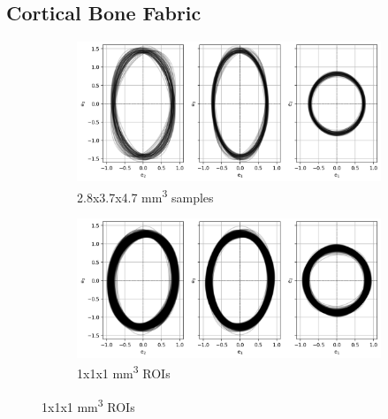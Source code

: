 \documentclass[a4paper,fleqn]{DC_ArtStyle}
\begin{document}
	\subsection{Cortical Bone Fabric}
	\begin{figure}
		\begin{subfigure}[b]{\linewidth}
			\includegraphics[width=\linewidth]{SamplesFabric}
			\caption{2.8x3.7x4.7 mm\textsuperscript{3} samples}
		\end{subfigure}
		\begin{subfigure}[b]{\linewidth}
			\includegraphics[width=\linewidth]{ROIsFabric}
			\caption{1x1x1 mm\textsuperscript{3} ROIs}
		\end{subfigure}
	\end{figure}

	\clearpage
\end{document}

